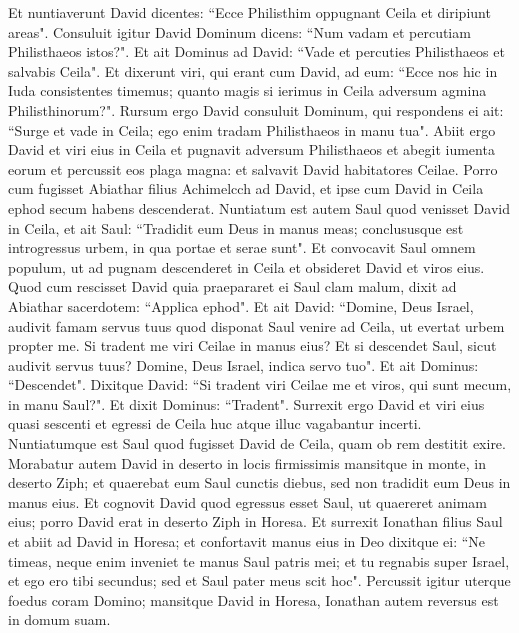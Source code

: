 \begin{biblechapter}  
\verse Et nuntiaverunt David dicentes: “Ecce Philisthim oppugnant Ceila et diripiunt areas". 
\verse Consuluit igitur David Dominum dicens: “Num vadam et percutiam Philisthaeos istos?". Et ait Dominus ad David: “Vade et percuties Philisthaeos et salvabis Ceila". 
\verse Et dixerunt viri, qui erant cum David, ad eum: “Ecce nos hic in Iuda consistentes timemus; quanto magis si ierimus in Ceila adversum agmina Philisthinorum?". 
\verse Rursum ergo David consuluit Dominum, qui respondens ei ait: “Surge et vade in Ceila; ego enim tradam Philisthaeos in manu tua". 
\verse Abiit ergo David et viri eius in Ceila et pugnavit adversum Philisthaeos et abegit iumenta eorum et percussit eos plaga magna: et salvavit David habitatores Ceilae. 
\verse Porro cum fugisset Abiathar filius Achimelcch ad David, et ipse cum David in Ceila ephod secum habens descenderat. 
\verse Nuntiatum est autem Saul quod venisset David in Ceila, et ait Saul: “Tradidit eum Deus in manus meas; conclususque est introgressus urbem, in qua portae et serae sunt". 
\verse Et convocavit Saul omnem populum, ut ad pugnam descenderet in Ceila et obsideret David et viros eius. 
\verse Quod cum rescisset David quia praepararet ei Saul clam malum, dixit ad Abiathar sacerdotem: “Applica ephod".  
\verse Et ait David: “Domine, Deus Israel, audivit famam servus tuus quod disponat Saul venire ad Ceila, ut evertat urbem propter me. 
\verse Si tradent me viri Ceilae in manus eius? Et si descendet Saul, sicut audivit servus tuus? Domine, Deus Israel, indica servo tuo". Et ait Dominus: “Descendet". 
\verse Dixitque David: “Si tradent viri Ceilae me et viros, qui sunt mecum, in manu Saul?". Et dixit Dominus: “Tradent". 
\verse Surrexit ergo David et viri eius quasi sescenti et egressi de Ceila huc atque illuc vagabantur incerti. Nuntiatumque est Saul quod fugisset David de Ceila, quam ob rem destitit exire. 
\verse Morabatur autem David in deserto in locis firmissimis mansitque in monte, in deserto Ziph; et quaerebat eum Saul cunctis diebus, sed non tradidit eum Deus in manus eius. 
\verse Et cognovit David quod egressus esset Saul, ut quaereret animam eius; porro David erat in deserto Ziph in Horesa. 
\verse Et surrexit Ionathan filius Saul et abiit ad David in Horesa; et confortavit manus eius in Deo dixitque ei: 
\verse “Ne timeas, neque enim inveniet te manus Saul patris mei; et tu regnabis super Israel, et ego ero tibi secundus; sed et Saul pater meus scit hoc".  
\verse Percussit igitur uterque foedus coram Domino; mansitque David in Horesa, Ionathan autem reversus est in domum suam. 

\end{biblechapter}
